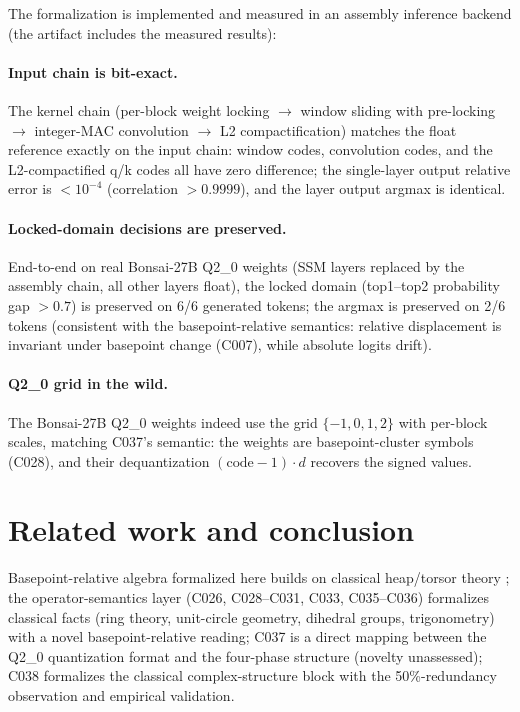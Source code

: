 \documentclass[sigplan,10pt,anonymous,review]{acmart}
\begin{document}
The formalization is implemented and measured in an assembly inference backend
(the artifact includes the measured results):

\paragraph{Input chain is bit-exact.} The kernel chain
(per-block weight locking $\to$ window sliding with pre-locking $\to$
integer-MAC convolution $\to$ L2 compactification) matches the float reference
exactly on the input chain: window codes, convolution codes, and the L2-compactified
q/k codes all have zero difference; the single-layer output relative error is
$< 10^{-4}$ (correlation $> 0.9999$), and the layer output argmax is identical.

\paragraph{Locked-domain decisions are preserved.} End-to-end on real
Bonsai-27B Q2\_0 weights (SSM layers replaced by the assembly chain, all other
layers float), the locked domain (top1--top2 probability gap $> 0.7$) is
preserved on 6/6 generated tokens; the argmax is preserved on 2/6 tokens
(consistent with the basepoint-relative semantics: relative displacement is
invariant under basepoint change (C007), while absolute logits drift).

\paragraph{Q2\_0 grid in the wild.} The Bonsai-27B Q2\_0 weights indeed use
the grid $\{-1,0,1,2\}$ with per-block scales, matching C037's semantic: the
weights are basepoint-cluster symbols (C028), and their dequantization
$(\text{code}-1)\cdot d$ recovers the signed values.

\section{Related work and conclusion}

Basepoint-relative algebra formalized here builds on classical heap/torsor
theory \cite{bergman2009universal}; the operator-semantics layer (C026, C028--C031, C033,
C035--C036) formalizes classical facts (ring theory, unit-circle geometry,
dihedral groups, trigonometry) with a novel basepoint-relative reading; C037
is a direct mapping between the Q2\_0 quantization format and the four-phase
structure (novelty unassessed); C038 formalizes the classical complex-structure
block with the 50\%-redundancy observation and empirical validation.
\end{document}
